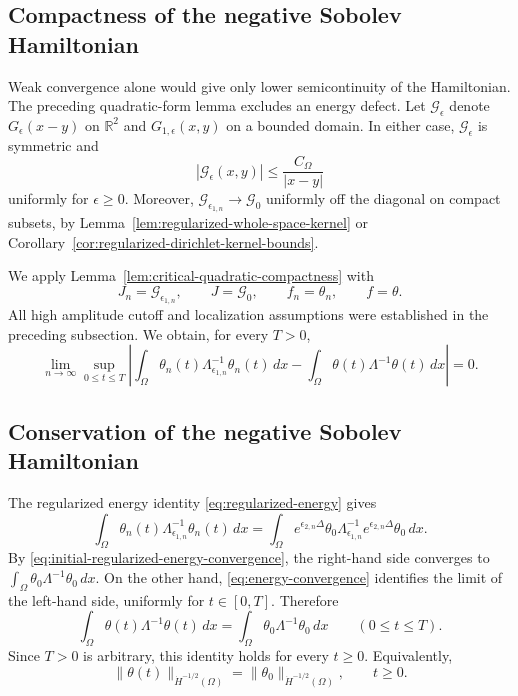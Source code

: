 \documentclass[11pt,reqno]{amsproc}
\newcommand{\R}{\mathbb R}
\newcommand{\Om}{\Omega}
\newcommand{\dd}{\,d}
\newcommand{\Lam}{\Lambda}
\begin{document}
\subsection{Compactness of the negative Sobolev Hamiltonian}

Weak convergence alone would give only lower semicontinuity of the
Hamiltonian.  The preceding quadratic-form lemma excludes an energy defect.
Let $\mathscr G_\epsilon$ denote $G_\epsilon(x-y)$ on $\R^2$ and
$G_{1,\epsilon}(x,y)$ on a bounded domain.  In either case,
$\mathscr G_\epsilon$ is symmetric and
\[
  |\mathscr G_\epsilon(x,y)|\leq\frac{C_\Om}{|x-y|}
\]
uniformly for $\epsilon\geq0$.  Moreover,
$\mathscr G_{\epsilon_{1,n}}\to\mathscr G_0$ uniformly off the diagonal on
compact subsets, by Lemma~\ref{lem:regularized-whole-space-kernel} or
Corollary~\ref{cor:regularized-dirichlet-kernel-bounds}.

We apply Lemma~\ref{lem:critical-quadratic-compactness} with
\[
  J_n=\mathscr G_{\epsilon_{1,n}},
  \qquad J=\mathscr G_0,
  \qquad f_n=\theta_n,
  \qquad f=\theta.
\]
All high amplitude cutoff  and localization assumptions were established in the preceding
subsection.  We obtain, for every $T>0$,
\begin{equation}\label{eq:energy-convergence}
 \lim_{n\to\infty}\sup_{0\leq t\leq T}
 \left|
  \int_\Om\theta_n(t)\Lam_{\epsilon_{1,n}}^{-1}\theta_n(t)\dd x
  -\int_\Om\theta(t)\Lam^{-1}\theta(t)\dd x
 \right|=0.
\end{equation}
\subsection{Conservation of the negative Sobolev Hamiltonian}

The regularized energy identity \eqref{eq:regularized-energy} gives
\[
  \int_\Om \theta_n(t)
  \Lam_{\epsilon_{1,n}}^{-1}\theta_n(t)\dd x
  =
  \int_\Om e^{\epsilon_{2,n}\Delta}\theta_0
  \Lam_{\epsilon_{1,n}}^{-1}
  e^{\epsilon_{2,n}\Delta}\theta_0\dd x.
\]
By \eqref{eq:initial-regularized-energy-convergence}, the right-hand side
converges to $\int_\Om\theta_0\Lam^{-1}\theta_0\dd x$.
On the other hand, \eqref{eq:energy-convergence} identifies the limit of the
left-hand side, uniformly for $t\in[0,T]$.  Therefore
\[
  \int_\Om\theta(t)\Lam^{-1}\theta(t)\dd x
  =\int_\Om\theta_0\Lam^{-1}\theta_0\dd x
  \qquad (0\leq t\leq T).
\]
Since $T>0$ is arbitrary, this identity holds for every $t\geq0$.  Equivalently,
\[
  \|\theta(t)\|_{\dot H^{-1/2}(\Om)}
  =\|\theta_0\|_{\dot H^{-1/2}(\Om)},
  \qquad t\geq0.
\]
\end{document}

